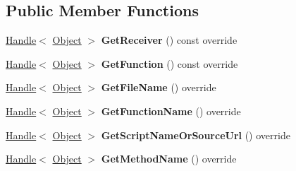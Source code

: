 \subsection*{Public Member Functions}
\begin{DoxyCompactItemize}
\item 
\mbox{\label{classv8_1_1internal_1_1WasmStackFrame_aa09f5986d5458c800fdbb19afe78013b}} 
\mbox{\hyperlink{classv8_1_1internal_1_1Handle}{Handle}}$<$ \mbox{\hyperlink{classv8_1_1internal_1_1Object}{Object}} $>$ {\bfseries Get\+Receiver} () const override
\item 
\mbox{\label{classv8_1_1internal_1_1WasmStackFrame_ae801266c49261344704f3ba6fb459610}} 
\mbox{\hyperlink{classv8_1_1internal_1_1Handle}{Handle}}$<$ \mbox{\hyperlink{classv8_1_1internal_1_1Object}{Object}} $>$ {\bfseries Get\+Function} () const override
\item 
\mbox{\label{classv8_1_1internal_1_1WasmStackFrame_aa7aa8c107e37c9ad4496cc2b595365fc}} 
\mbox{\hyperlink{classv8_1_1internal_1_1Handle}{Handle}}$<$ \mbox{\hyperlink{classv8_1_1internal_1_1Object}{Object}} $>$ {\bfseries Get\+File\+Name} () override
\item 
\mbox{\label{classv8_1_1internal_1_1WasmStackFrame_a63de4da9abbd63ba986679a3e1211004}} 
\mbox{\hyperlink{classv8_1_1internal_1_1Handle}{Handle}}$<$ \mbox{\hyperlink{classv8_1_1internal_1_1Object}{Object}} $>$ {\bfseries Get\+Function\+Name} () override
\item 
\mbox{\label{classv8_1_1internal_1_1WasmStackFrame_a33528fcc57cf4dfe429ba14f7f247243}} 
\mbox{\hyperlink{classv8_1_1internal_1_1Handle}{Handle}}$<$ \mbox{\hyperlink{classv8_1_1internal_1_1Object}{Object}} $>$ {\bfseries Get\+Script\+Name\+Or\+Source\+Url} () override
\item 
\mbox{\label{classv8_1_1internal_1_1WasmStackFrame_a12ff33d1feb28083f3cd9c9a126a297d}} 
\mbox{\hyperlink{classv8_1_1internal_1_1Handle}{Handle}}$<$ \mbox{\hyperlink{classv8_1_1internal_1_1Object}{Object}} $>$ {\bfseries Get\+Method\+Name} () override
\item 

\end{DoxyCompactItemize}
